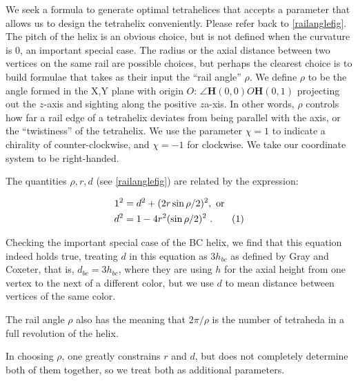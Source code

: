 \documentclass[twocolumn,10pt]{asme2ej}
\newcommand\numberthis{\addtocounter{equation}{1}\tag{\theequation}}
\renewcommand{\vec}[1]{\mathbf{#1}}
\begin{document}
We seek a formula to generate optimal tetrahelices that accepts a
parameter that allows us to design the tetrahelix conveniently.
Please refer back to \cref{railanglefig}.
The pitch of the helix is an obvious choice, but is not defined when the
curvature is $0$, an important special case. The radius or the axial
distance between two vertices on the same rail are possible choices, but
perhaps the clearest choice is to build formulae that takes as their
input the ``rail angle'' $\rho$. We define $\rho$ to be the angle
formed in the X,Y plane with origin $O$: $\angle \vec{H}(0,0) O \vec{H}(0,1)$ projecting out the
$z$-axis and sighting along the positive $z$a-xis. In other words, $\rho$
controls how far a rail edge of a tetrahelix deviates from being
parallel with the axis, or the ``twistiness'' of the tetrahelix. We use
the parameter $\chi = 1$ to indicate a chirality of counter-clockwise,
and $\chi = -1$ for clockwise. We take our coordinate system to be right-handed.

The quantities $\rho,r,d$ (see \cref{railanglefig}) are related by the expression:

\begin{align*}
  1^2 &= d^2 + (2 r \sin{ \rho / 2})^2 , \text{ or }\\
  d^2 &= 1 - 4 r^2 (\sin{ \rho / 2})^2  \text{ .}  \numberthis  \label{railangle} \\
\end{align*}

Checking the important special case of the BC helix, we find that this equation
indeed holds true, treating $d$ in this equation as $3 h_{bc}$ as defined by
Gray and Coxeter, that is, $d_{bc} = 3h_{bc}$, where they are using
$h$ for the axial height from one vertex to
the next of a different color, but we use $d$ to mean distance between vertices of
the  same color.

The rail angle $\rho$ also has the meaning that $2 \pi / \rho$ is the number of
tetraheda in a full revolution of the helix.

In choosing $\rho$, one greatly constrains $r$ and $d$, but does not completely
determine both of them together, so we treat both as additional parameters.
\end{document}
